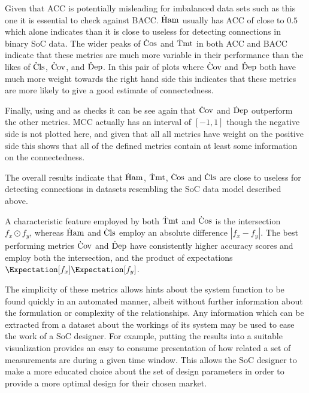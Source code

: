 \documentclass[runningheads]{llncs}
\begin{document}
Given that \gls{ACC} is potentially misleading for imbalanced data sets such as
this one it is essential to check against \gls{BACC}.
$\operatorname{\dot{H}am}$ usually has \gls{ACC} of close to $0.5$ which alone indicates than it is
close to useless for detecting connections in binary \gls{SoC} data.
The wider peaks of $\operatorname{\dot{C}os}$ and $\operatorname{\dot{T}mt}$ in both \gls{ACC} and \gls{BACC} indicate
that these metrics are much more variable in their performance than the likes of
$\operatorname{\dot{C}ls}$, $\operatorname{\dot{C}ov}$, and $\operatorname{\dot{D}ep}$.
In this pair of plots where $\operatorname{\dot{C}ov}$ and $\operatorname{\dot{D}ep}$ both have much more weight
towards the right hand side this indicates that these metrics are more likely to
give a good estimate of connectedness.

Finally, using  and  as checks
it can be see again that $\operatorname{\dot{C}ov}$ and $\operatorname{\dot{D}ep}$ outperform the other metrics.
\gls{MCC} actually has an interval of $[-1,1]$ though the negative side is not
plotted here, and given that all all metrics have weight on the positive side
this shows that all of the defined metrics contain at least some information on
the connectedness.

The overall results indicate that $\operatorname{\dot{H}am}$, $\operatorname{\dot{T}mt}$, $\operatorname{\dot{C}os}$ and $\operatorname{\dot{C}ls}$ are
close to useless for detecting connections in datasets resembling the \gls{SoC}
data model described above.

A characteristic feature employed by both $\operatorname{\dot{T}mt}$ and $\operatorname{\dot{C}os}$ is the intersection
$f_x \odot f_y$, whereas $\operatorname{\dot{H}am}$ and $\operatorname{\dot{C}ls}$ employ an absolute difference
$\left| f_x - f_y \right|$.
The best performing metrics $\operatorname{\dot{C}ov}$ and $\operatorname{\dot{D}ep}$ have consistently higher
accuracy scores and employ both the intersection, and the product of
expectations $\sEx{f_x} \sEx{f_y}$.

The simplicity of these metrics allows hints about the system function
to be found quickly in an automated manner, albeit without further
information about the formulation or complexity of the relationships.
Any information which can be extracted from a dataset about the workings of its
system may be used to ease the work of a \gls{SoC} designer.
For example, putting the results into a suitable visualization provides
an easy to consume presentation of how related a set of measurements are during
a given time window.
This allows the \gls{SoC} designer to make a more educated choice about the set
of design parameters in order to provide a more optimal design for their chosen
market.
\end{document}
